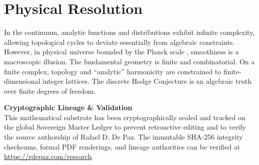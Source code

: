 \documentclass[12pt, a4paper]{article}
\theoremstyle{plain}
\theoremstyle{definition}
\theoremstyle{remark}
\begin{document}
\section{Physical Resolution}

In the continuum, analytic functions and distributions exhibit infinite complexity,
allowing topological cycles to deviate essentially from algebraic constraints.
However, in physical universe bounded by the Planck scale \citep{Rovelli2004},
smoothness is a macroscopic illusion. The fundamental geometry is finite and
combinatorial. On a finite complex, topology and ``analytic'' harmonicity are
constrained to finite-dimensional integer lattices. The discrete Hodge Conjecture
is an algebraic truth over finite degrees of freedom.


\vspace{2em}
\noindent\hrulefill
\vspace{1em}

\noindent\textbf{Cryptographic Lineage \& Validation}\\
This mathematical substrate has been cryptographically sealed and tracked on the global Sovereign Master Ledger to prevent retroactive editing and to verify the source authorship of Rafael D. De Paz. The immutable SHA-256 integrity checksums, formal PDF renderings, and lineage authorities can be verified at \url{https://rdepaz.com/research}.



\end{document}
